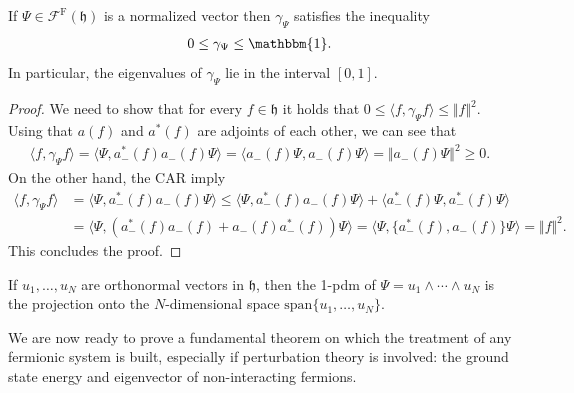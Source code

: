 \begin{lemma}\cite[p.~42]{SolNotes}
	If $\Psi\in\mathcal{F}^{\mathrm{F}}(\mathfrak{h})$ is a normalized vector then $\gamma_\Psi$
	satisfies the inequality
	\begin{align*}
		0 \leq \gamma_\Psi \leq \mathbbm{1}.
	\end{align*}
	In particular, the eigenvalues of $\gamma_\Psi$ lie in the interval $[0,1]$.
\end{lemma}
\begin{proof}
	We need to show that for every $f\in\mathfrak{h}$ it holds that
	$0\leq\langle f,\gamma_\Psi f\rangle\leq\Vert f\Vert^2$. Using that $a(f)$ and $a^*(f)$
	are adjoints of each other, we can see that
	\begin{align*}
		\langle f,\gamma_\Psi f\rangle = \langle\Psi, a^*_-(f)a_-(f)\Psi\rangle
		= \langle a_-(f)\Psi, a_-(f)\Psi\rangle = \Vert a_-(f)\Psi\Vert^2 \geq 0.
	\end{align*}
	On the other hand, the CAR imply
	\begin{align*}
		\langle f,\gamma_\Psi f\rangle
		&= \langle\Psi, a^*_-(f)a_-(f)\Psi\rangle
		\leq \langle\Psi, a^*_-(f)a_-(f)\Psi\rangle + \langle a^*_-(f)\Psi,a^*_-(f)\Psi\rangle\\
		&= \langle \Psi, (a^*_-(f)a_-(f) + a_-(f)a^*_-(f))\Psi\rangle
		= \langle \Psi, \{a^*_-(f),a_-(f)\}\Psi\rangle = \Vert f\Vert^2.
	\end{align*}
	This concludes the proof.
\end{proof}

\begin{lemma}
	If $u_1,\ldots,u_N$ are orthonormal vectors in $\mathfrak{h}$, then the 1-pdm of $\Psi=
	u_1\wedge\cdots\wedge u_N$ is the projection onto the $N$-dimensional space $\mathrm{span}\{
	u_1,\ldots,u_N\}$.
\end{lemma}

We are now ready to prove a fundamental theorem on which the treatment of any fermionic system
is built, especially if perturbation theory is involved: the ground state energy and
eigenvector of non-interacting fermions.

